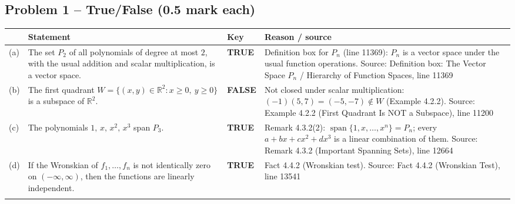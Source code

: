 \documentclass[11pt,a4paper]{article}
\newcommand{\Src}[1]{{\footnotesize\color{black!65}Source: #1}}
\begin{document}
\subsection*{Problem 1 -- True/False (0.5 mark each)}
\begin{tabularx}{\linewidth}{@{}l >{\raggedright\arraybackslash}X l >{\raggedright\arraybackslash}X@{}}\toprule & Statement & Key & Reason / source\\\midrule
(a) & The set $P_2$ of all polynomials of degree at most $2$, with the usual addition and scalar multiplication, is a vector space. & \textbf{TRUE} & Definition box for $P_n$ (line 11369): $P_n$ is a vector space under the usual function operations. \Src{Definition box: The Vector Space $P_n$ / Hierarchy of Function Spaces, line 11369}\\\addlinespace
(b) & The first quadrant $W=\{(x,y)\in\mathbb{R}^2 : x\ge 0,\ y\ge 0\}$ is a subspace of $\mathbb{R}^2$. & \textbf{FALSE} & Not closed under scalar multiplication: $(-1)(5,7)=(-5,-7)\notin W$ (Example 4.2.2). \Src{Example 4.2.2 (First Quadrant Is NOT a Subspace), line 11200}\\\addlinespace
(c) & The polynomials $1,\,x,\,x^{2},\,x^{3}$ span $P_3$. & \textbf{TRUE} & Remark 4.3.2(2): $\operatorname{span}\{1,x,\dots,x^n\}=P_n$; every $a+bx+cx^2+dx^3$ is a linear combination of them. \Src{Remark 4.3.2 (Important Spanning Sets), line 12664}\\\addlinespace
(d) & If the Wronskian of $f_1,\dots,f_n$ is not identically zero on $(-\infty,\infty)$, then the functions are linearly independent. & \textbf{TRUE} & Fact 4.4.2 (Wronskian test). \Src{Fact 4.4.2 (Wronskian Test), line 13541}\\\addlinespace
\bottomrule\end{tabularx}
\end{document}
